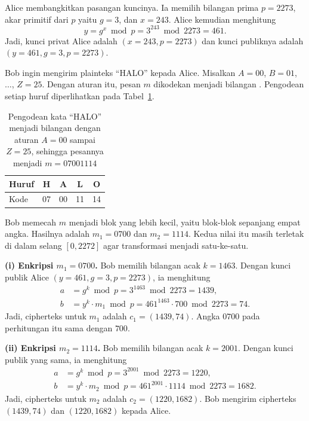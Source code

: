 \begin{example}[Pesan ``HALO'' dengan $p = 2273$]
\label{ex:elgamal-halo}
Alice membangkitkan pasangan kuncinya. Ia memilih bilangan prima $p = 2273$,
akar primitif dari $p$ yaitu $g = 3$, dan $x = 243$. Alice kemudian menghitung
\[ y = g^{x} \bmod p = 3^{243} \bmod 2273 = 461 . \]
Jadi, kunci privat Alice adalah $(x = 243, p = 2273)$ dan kunci publiknya
adalah $(y = 461, g = 3, p = 2273)$.

Bob ingin mengirim plainteks ``HALO'' kepada Alice. Misalkan $A = 00$,
$B = 01$, $\dots$, $Z = 25$. Dengan aturan itu, pesan $m$ dikodekan menjadi
bilangan . Pengodean setiap huruf diperlihatkan pada
Tabel~\ref{tab:pengodean-halo}.

\begin{table}[htbp]
    \centering
    \begin{tabular}{@{}l c c c c@{}}
    \toprule
    Huruf & H & A & L & O \\
    \midrule
    Kode  & 07 & 00 & 11 & 14 \\
    \bottomrule
    \end{tabular}
    \caption{Pengodean kata ``HALO'' menjadi bilangan dengan aturan $A = 00$
    sampai $Z = 25$, sehingga pesannya menjadi $m = 07001114$}
    \label{tab:pengodean-halo}
\end{table}

Bob memecah $m$ menjadi blok yang lebih kecil, yaitu blok-blok sepanjang empat
angka. Hasilnya adalah $m_{1} = 0700$ dan $m_{2} = 1114$. Kedua nilai itu masih
terletak di dalam selang $[0, 2272]$ agar transformasi menjadi satu-ke-satu.

\textbf{(i) Enkripsi $m_{1} = 0700$.} Bob memilih bilangan acak $k = 1463$.
Dengan kunci publik Alice $(y = 461, g = 3, p = 2273)$, ia menghitung
\begin{align*}
a &= g^{k} \bmod p = 3^{1463} \bmod 2273 = 1439, \\
b &= y^{k} \cdot m_{1} \bmod p = 461^{1463} \cdot 700 \bmod 2273 = 74 .
\end{align*}
Jadi, cipherteks untuk $m_{1}$ adalah $c_{1} = (1439, 74)$. Angka $0700$ pada
perhitungan itu sama dengan $700$.

\textbf{(ii) Enkripsi $m_{2} = 1114$.} Bob memilih bilangan acak $k = 2001$.
Dengan kunci publik yang sama, ia menghitung
\begin{align*}
a &= g^{k} \bmod p = 3^{2001} \bmod 2273 = 1220, \\
b &= y^{k} \cdot m_{2} \bmod p = 461^{2001} \cdot 1114 \bmod 2273 = 1682 .
\end{align*}
Jadi, cipherteks untuk $m_{2}$ adalah $c_{2} = (1220, 1682)$. Bob mengirim
cipherteks $(1439, 74)$ dan $(1220, 1682)$ kepada Alice.


\end{example}
